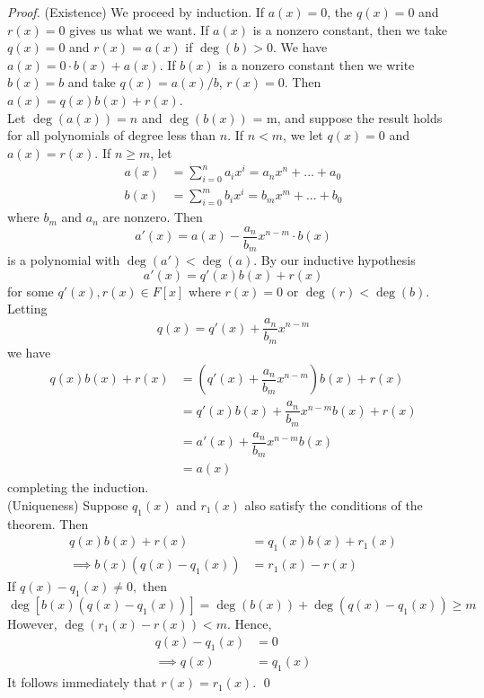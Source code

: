 \begin{proof}
    (Existence) We proceed by induction. If $a(x) = 0$, the $q(x) = 0$ and $r(x) = 0$ gives us what we want. If $a(x)$ is a nonzero constant, then we take $q(x) = 0$ and $r(x) = a(x)$ if $\deg (b) > 0$. We have $a(x) = 0 \cdot b(x) + a(x)$. If $b(x)$ is a nonzero constant then we write $b(x) = b$ and take $q(x) = a(x)/b$, $r(x) = 0$. Then $a(x) = q(x)b(x) + r(x).$\\
    Let $\deg(a(x)) = n$ and $\deg(b(x))$ = m, and suppose the result holds for all polynomials of degree less than $n$. If $n < m$, we let $q(x) = 0$ and $a(x) = r(x)$. If $n \geq m$, let
    \begin{align*}
        a(x) &= \sum_{i=0}^{n}a_ix^i = a_nx^n + ... + a_0 \\
        b(x) &= \sum_{i=0}^{m}b_ix^i = b_mx^m + ... + b_0
    \end{align*}
    where $b_m$ and $a_n$ are nonzero. Then 
    $$a'(x) = a(x) - \dfrac{a_n}{b_m}x^{n-m} \cdot b(x)$$
    is a polynomial with $\deg(a') < \deg(a)$. By our inductive hypothesis 
    $$a'(x) = q'(x)b(x) + r(x)$$
    for some $q'(x), r(x) \in F[x]$ where $r(x) = 0$ or $\deg(r) < \deg(b)$. Letting 
    $$q(x) = q'(x) + \dfrac{a_n}{b_m}x^{n-m}$$
    we have
    \begin{align*}
        q(x)b(x)+r(x) &= \left(q'(x)+\dfrac{a_n}{b_m}x^{n-m}\right)b(x)+r(x) \\
        &= q'(x)b(x)+\dfrac{a_n}{b_m}x^{n-m}b(x) +r(x) \\
        &= a'(x) + \dfrac{a_n}{b_m}x^{n-m}b(x) \\
        &=a(x)
    \end{align*}
    completing the induction. \\
    (Uniqueness) Suppose $q_1(x)$ and $r_1(x)$ also satisfy the conditions of the theorem. Then 
    \begin{align*}
        q(x)b(x)+r(x) &= q_1(x)b(x)+r_1(x) \\
        \implies b(x)(q(x)-q_1(x)) &= r_1(x) - r(x)
    \end{align*}
    If $q(x) - q_1(x) \neq 0,$ then
    $$\deg[b(x)(q(x)-q_1(x))] = \deg(b(x)) + \deg(q(x) - q_1(x)) \geq m$$
    However, $\deg(r_1(x) - r(x)) < m$. Hence,
    \begin{align*}
        q(x) - q_1(x) &= 0 \\
        \implies q(x) &= q_1(x)
    \end{align*}
    It follows immediately that $r(x) = r_1(x)$.
    \qed
\end{proof}

